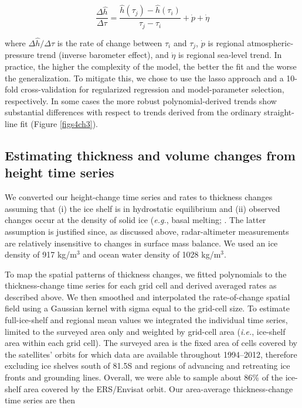 \begin{equation}
  \frac{\Delta \hat h}{\Delta \tau} = \frac{\hat h(\tau_j) - \hat h(\tau_i)}
  {\tau_j - \tau_i} + \dot p + \dot \eta
\end{equation}

where $\Delta \hat h / \Delta \tau$ is the rate of change between $\tau_i$ and
$\tau_j$, $\dot p$ is regional atmospheric-pressure trend (inverse barometer
effect), and $\dot \eta$ is regional sea-level trend. In practice, the higher
the complexity of the model, the better the fit and the worse the
generalization. To mitigate this, we chose to use the lasso approach
\parencite{Tibshirani1996} and a 10-fold cross-validation for regularized
regression and model-parameter selection, respectively. In some cases the more
robust polynomial-derived trends show substantial differences with respect to
trends derived from the ordinary straight-line fit (Figure \ref{figs4ch3}).

\subsection*{Estimating thickness and volume changes from height time series}

We converted our height-change time series and rates to thickness changes
assuming that (i) the ice shelf is in hydrostatic equilibrium and (ii)
observed changes occur at the density of solid ice ({\it e.g.}, basal melting;
\parencite{Shepherd2010, Pritchard2012, Wingham2009}. The latter assumption is
justified since, as discussed above, radar-altimeter measurements are
relatively insensitive to changes in surface mass balance. We used an ice
density of 917 kg/m$^3$ and ocean water density of 1028 kg/m$^3$.

To map the spatial patterns of thickness changes, we fitted polynomials to the
thickness-change time series for each grid cell and derived averaged rates as
described above. We then smoothed and interpolated the rate-of-change spatial
field using a Gaussian kernel with sigma equal to the grid-cell size. To
estimate full-ice-shelf and regional mean values we integrated the individual
time series, limited to the surveyed area only and weighted by grid-cell area
({\it i.e.}, ice-shelf area within each grid cell). The surveyed area is the fixed
area of cells covered by the satellites' orbits for which data are available
throughout 1994--2012, therefore excluding ice shelves south of 81.5\degree S
and regions of advancing and retreating ice fronts and grounding lines.
Overall, we were able to sample about 86\% of the ice-shelf area covered by
the ERS/Envisat orbit. Our area-average thickness-change time series are then

